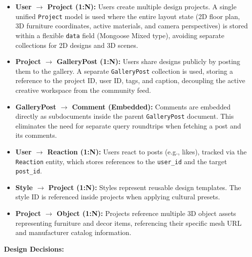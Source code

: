 \begin{itemize}
    \item \textbf{User $\rightarrow$ Project (1:N):} Users create multiple design projects. A single unified \texttt{Project} model is used where the entire layout state (2D floor plan, 3D furniture coordinates, active materials, and camera perspectives) is stored within a flexible \texttt{data} field (Mongoose Mixed type), avoiding separate collections for 2D designs and 3D scenes.
    
    \item \textbf{Project $\rightarrow$ GalleryPost (1:N):} Users share designs publicly by posting them to the gallery. A separate \texttt{GalleryPost} collection is used, storing a reference to the project ID, user ID, tags, and caption, decoupling the active creative workspace from the community feed.
    
    \item \textbf{GalleryPost $\rightarrow$ Comment (Embedded):} Comments are embedded directly as subdocuments inside the parent \texttt{GalleryPost} document. This eliminates the need for separate query roundtrips when fetching a post and its comments.
    
    \item \textbf{User $\rightarrow$ Reaction (1:N):} Users react to posts (e.g., likes), tracked via the \texttt{Reaction} entity, which stores references to the \texttt{user\_id} and the target \texttt{post\_id}.
    
    \item \textbf{Style $\rightarrow$ Project (1:N):} Styles represent reusable design templates. The style ID is referenced inside projects when applying cultural presets.
    
    \item \textbf{Project $\rightarrow$ Object (1:N):} Projects reference multiple 3D object assets representing furniture and decor items, referencing their specific mesh URL and manufacturer catalog information.
\end{itemize}

\textbf{Design Decisions:}

